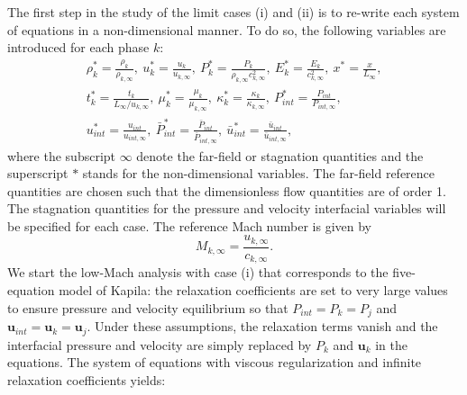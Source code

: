 \documentclass[preprint,10pt]{elsarticle}
\newcommand{\mbold}[1]{\boldsymbol#1}
\begin{document}
The first step in the study of the limit cases (i) and (ii) is to re-write each system of equations in a non-dimensional manner. To do so, the following variables are introduced for each phase $k$:
%
\begin{multline}
\label{eq:norm_param}
\rho_k^*   = \frac{\rho_k}{\rho_{k,\infty}}           ,\
u_k^*      = \frac{u_k}{u_{k,\infty}}                 ,\
P_k^*      = \frac{P_k}{\rho_{k,\infty} c^2_{k,\infty}}   ,\
E_k^*      = \frac{E_k}{c^2_{k,\infty} }              ,\
x^* = \frac{x}{L_\infty}                      ,\\
t_k^* = \frac{t_k}{L_\infty / u_{k,\infty}}           ,\
\mu_k^*    = \frac{\mu_k}{\mu_{k,\infty}}             ,\
\kappa_k^* = \frac{\kappa_k}{\kappa_{k,\infty}}       ,\
P_{int}^*    = \frac{P_{int}}{P_{int,\infty}}             ,\\
u_{int}^* = \frac{u_{int}}{u_{int,\infty}}       ,\
\bar{P}_{int}^*    = \frac{\bar{P}_{int}}{\bar{P}_{int,\infty}}             ,\
\bar{u}_{int}^* = \frac{\bar{u}_{int}}{\bar{u}_{int,\infty}}       ,\
\end{multline}
%
where  the subscript $\infty$ denote the far-field or stagnation quantities and the superscript $*$ stands for the non-dimensional variables. The far-field reference quantities are chosen such that the dimensionless flow quantities are of order 1. The stagnation quantities for the pressure and velocity interfacial variables will be specified for each case. The reference Mach number is given by
%
\begin{equation}
M_{k,\infty} = \frac{u_{k,\infty}}{c_{k,\infty}}.
\end{equation}
%
We start the low-Mach analysis with case (i) that corresponds to the five-equation model of Kapila:
the relaxation coefficients are set to very large values to ensure pressure and velocity equilibrium so that $P_{int} = P_k = P_j$ and $\mbold u_{int} = \mbold u_k = \mbold u_j$. Under these assumptions, the relaxation terms vanish and the interfacial pressure and velocity are simply replaced by $P_k$ and $\mbold u_k$ in the equations. The system of equations with viscous regularization and infinite relaxation coefficients yields:
% 
\end{document}
